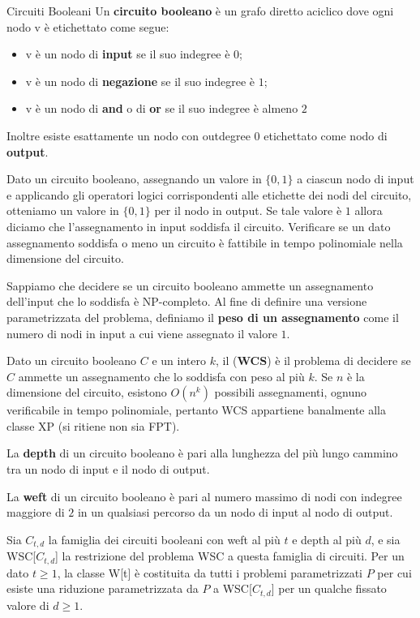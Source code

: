 \documentclass[10pt,a4paper]{article}
\begin{document}
\begin{multicols}{3}
\begin{textbox}{Circuiti Booleani}
Un \textbf{circuito booleano} è un grafo diretto aciclico dove ogni nodo v
è etichettato come segue:
\begin{itemize}[leftmargin=*]
    \item v è un nodo di \textbf{input} se il suo indegree è \(0\);
    \item v è un nodo di \textbf{negazione} se il suo indegree è \(1\);
    \item v è un nodo di \textbf{and} o di \textbf{or} se il suo indegree è almeno \(2\)
\end{itemize}
Inoltre esiste esattamente un nodo con outdegree \(0\) etichettato
come nodo di \textbf{output}.

Dato un circuito booleano, assegnando un valore in \(\{0,1\}\) a
ciascun nodo di input e applicando gli operatori logici
corrispondenti alle etichette dei nodi del circuito, otteniamo un
valore in \(\{0,1\}\) per il nodo in output.
Se tale valore è \(1\) allora diciamo che l’assegnamento in input
soddisfa il circuito.
Verificare se un dato assegnamento soddisfa o meno un
circuito è fattibile in tempo polinomiale nella dimensione del
circuito.

Sappiamo che decidere se un circuito booleano ammette un
assegnamento dell’input che lo soddisfa è
NP-completo.
Al fine di definire una versione parametrizzata del problema,
definiamo il \textbf{peso di un assegnamento} come il numero di nodi
in input a cui viene assegnato il valore \(1\).

Dato un circuito booleano \(C\) e un intero \(k\), il 
(\textbf{WCS}) è il problema di decidere se \(C\) ammette un
assegnamento che lo soddisfa con peso al più \(k\).
Se \(n\) è la dimensione del circuito, esistono \(O(n^k)\) possibili
assegnamenti, ognuno verificabile in tempo polinomiale,
pertanto WCS appartiene banalmente alla classe XP (si ritiene non sia FPT).

La \textbf{depth} di un circuito booleano è pari alla lunghezza
del più lungo cammino tra un nodo di input e il nodo di output.

La \textbf{weft} di un circuito booleano è pari al numero massimo
di nodi con indegree maggiore di \(2\) in un qualsiasi percorso da un
nodo di input al nodo di output.

Sia \(C_{t,d}\) la famiglia dei circuiti booleani con weft al più \(t\) e depth al
più \(d\), e sia WSC[\(C_{t,d}\)] la restrizione del problema WSC a questa
famiglia di circuiti.
Per un dato \(t \geq 1\), la classe W[t] è costituita da tutti i problemi
parametrizzati \(P\) per cui esiste una riduzione parametrizzata da \(P\) 
a WSC[\(C_{t,d}\)] per un qualche fissato valore di \(d \geq 1\).
\end{textbox}



\end{multicols}
\end{document}
